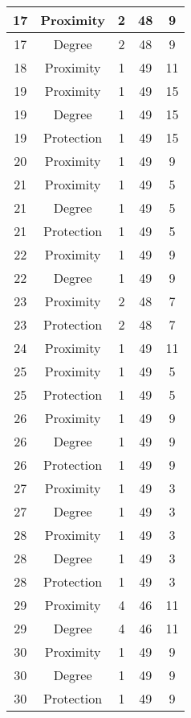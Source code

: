 \documentclass[results.tex]{subfiles}
\begin{document}
\begin{center}
\begin{tabular}{| c || c | c | c | c |}
    \hline
    17 & Proximity & 2 & 48 & 9 \\ 
    \hline
    17 & Degree & 2 & 48 & 9 \\ 
    \hline
    18 & Proximity & 1 & 49 & 11 \\ 
    \hline
    19 & Proximity & 1 & 49 & 15 \\ 
    \hline
    19 & Degree & 1 & 49 & 15 \\ 
    \hline
    19 & Protection & 1 & 49 & 15 \\ 
    \hline
    20 & Proximity & 1 & 49 & 9 \\ 
    \hline
    21 & Proximity & 1 & 49 & 5 \\ 
    \hline
    21 & Degree & 1 & 49 & 5 \\ 
    \hline
    21 & Protection & 1 & 49 & 5 \\ 
    \hline
    22 & Proximity & 1 & 49 & 9 \\ 
    \hline
    22 & Degree & 1 & 49 & 9 \\ 
    \hline
    23 & Proximity & 2 & 48 & 7 \\ 
    \hline
    23 & Protection & 2 & 48 & 7 \\ 
    \hline
    24 & Proximity & 1 & 49 & 11 \\ 
    \hline
    25 & Proximity & 1 & 49 & 5 \\ 
    \hline
    25 & Protection & 1 & 49 & 5 \\ 
    \hline
    26 & Proximity & 1 & 49 & 9 \\ 
    \hline
    26 & Degree & 1 & 49 & 9 \\ 
    \hline
    26 & Protection & 1 & 49 & 9 \\ 
    \hline
    27 & Proximity & 1 & 49 & 3 \\ 
    \hline
    27 & Degree & 1 & 49 & 3 \\ 
    \hline
    28 & Proximity & 1 & 49 & 3 \\ 
    \hline
    28 & Degree & 1 & 49 & 3 \\ 
    \hline
    28 & Protection & 1 & 49 & 3 \\ 
    \hline
    29 & Proximity & 4 & 46 & 11 \\ 
    \hline
    29 & Degree & 4 & 46 & 11 \\ 
    \hline
    30 & Proximity & 1 & 49 & 9 \\ 
    \hline
    30 & Degree & 1 & 49 & 9 \\ 
    \hline
    30 & Protection & 1 & 49 & 9 \\ 
    \hline

\end{tabular}
\end{center}
\end{document}
